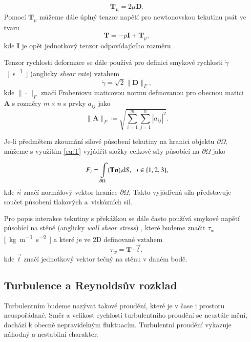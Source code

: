 \begin{equation}
\mathbf{T}_{\mu} = 2 \mu \mathbf{D}.
\end{equation}
Pomocí $\mathbf{T}_{\mu}$ můžeme dále úplný tenzor napětí pro newtonovskou tekutinu psát ve tvaru
\begin{equation}\label{eq:T}
\mathbf{T} = -p\mathbf{I} + \mathbf{T}_{\mu},
\end{equation}
kde $ \mathbf{I} $ je opět jednotkový tenzor odpovídajícího rozměru \cite{Cengel}.

Tenzor rychlosti deformace se dále používá pro definici smykové rychlosti $ \dot{\gamma} $~\si{[s^{-1}]} (anglicky \textit{shear rate}) \cite{Cengel} vztahem
\begin{equation}\label{eq:dot gamma}
\dot{\gamma}  = \sqrt{2} \| \mathbf{D} \| _{F},
\end{equation}
kde $ \| \cdot \| _{F} $ značí Frobeniovu maticovou normu definovanou pro obecnou matici $ \mathbf{A} $ s rozměry $ m \times n $ s prvky $ a_{ij} $ jako
\begin{equation}
\| \mathbf{A} \| _{F}  \coloneqq \sqrt{\sum_{i = 1}^{m} \sum_{j = 1}^{n} |a_{ij}|^2}.
\end{equation}

Je-li předmětem zkoumání silové působení tekutiny na hranici objektu $ \partial \Omega $, můžeme s využitím \eqref{eq:T} vyjádřit složky celkové síly působící na $ \partial \Omega $ jako

\begin{equation}\label{eq:stress_int}
{F}_{i} = \int\limits_{\partial\Omega}(\mathbf{T} \vec{n})_{i} \mathrm{d}S, \hspace{2mm} i \in \{1,2,3\},
\end{equation}
kde $ \vec{n} $ značí normálový vektor hranice $ \partial \Omega $. Takto vyjádřená síla představuje součet působení tlakových a~viskózních sil.

Pro popis interakce tekutiny s překážkou se dále často používá smykové napětí působící na stěně (anglicky \textit{wall shear stress}) \cite{WallStress}, které budeme značit $ \tau _w $ \si{[kg.m^{-1}.s^{-2}]} a které je ve 2D definované vztahem
\begin{equation}\label{eq:wall shear stress}
\tau_w = \mathbf{T} \cdot \vec{t},
\end{equation}
kde $ \vec{t} $ značí jednotkový vektor tečný na stěnu v daném bodě.

\subsection{Turbulence a Reynoldsův rozklad}\label{turb}
Turbulentním budeme nazývat takové proudění, které je v čase i prostoru neuspořádané. Směr a velikost rychlosti turbulentního proudění se neustále mění, dochází k obecně nepravidelným fluktuacím. Turbulentní proudění vykazuje náhodný a nestabilní charakter.

